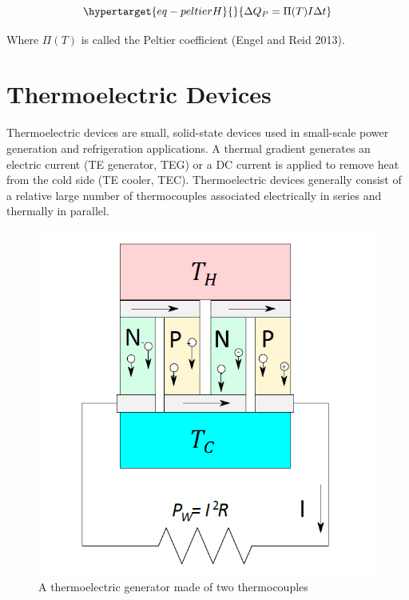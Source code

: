 \documentclass[
  letterpaper,
  DIV=11,
  numbers=noendperiod]{scrreprt}
\begin{document}
\begin{equation}\protect\hypertarget{eq-peltierH}{}{\Delta Q_{P} = \Pi(T)I\Delta t}\label{eq-peltierH}\end{equation}

Where \(\Pi(T)\) is called the Peltier coefficient (Engel and Reid
2013).


\hypertarget{thermoelectric-devices}{%
\chapter{Thermoelectric Devices}\label{thermoelectric-devices}}

Thermoelectric devices are small, solid-state devices used in
small-scale power generation and refrigeration applications. A thermal
gradient generates an electric current (TE generator, TEG) or a DC
current is applied to remove heat from the cold side (TE cooler, TEC).
Thermoelectric devices generally consist of a relative large number of
thermocouples associated electrically in series and thermally in
parallel.

\begin{figure}

{\centering \includegraphics{./images/thermocouple.png}

}

\caption{\label{fig-thermocouple}A thermoelectric generator made of two
thermocouples}

\end{figure}
\end{document}
